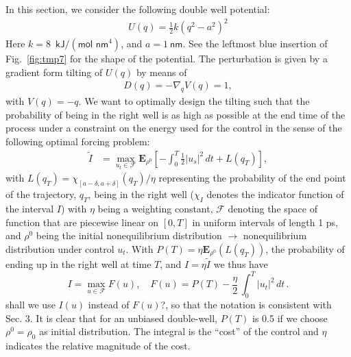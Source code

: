 \documentclass[]{tMPH2e}
\newcommand{\recheck}[1]{{\color{red} #1}}
\newcommand{\bE}{{\mathbf E}}
\begin{document}
In this section, we consider the following double well potential:
\begin{align}
  U( q) = \frac12 k ( q^2 - a^2)^2
\end{align}
Here $k = 8$~$\textsf{kJ} / (\textsf{mol nm}^4)$, and $ a = 1\
\textsf{nm}$.  See the leftmost blue insertion of Fig.~\ref{fig:tmp7} for
the shape of the potential.
The perturbation is given by a gradient form tilting of $U( q)$ by means of
\begin{align}
   D( q) = -\nabla_{ q} V( q) = 1,
\end{align}
with $V( q) = - q$. We want to
optimally design the tilting such that the probability
of being in the right well is as high as possible 
at the end time of the process under a constraint on the energy used for the control in the sense of
the following optimal forcing problem:
\begin{align}
  \tilde{I} & = \max_{u_t \in\mathcal F} \bE_{\rho^0}\left[ -\int_{0}^{T} \frac{1}{2}|u_{s}|^{2}\,dt + L(q_T) \right],
\end{align}
with $L(q_T)=\chi_{[a-\delta,a+\delta]}(q_T)/\eta$ representing the probability of the end point of the trajectory, $ q_T$, being in the right well ($\chi_I$ denotes the indicator function of the interval $I$) with $\eta$ being a weighting constant, ${\mathcal F}$ denoting the space of function that are piecewise linear  on $[0, T]$ in uniform intervals of length 1 ps, and $\rho^0$ being the
\recheck{initial nonequilibrium distribution $\rightarrow$ nonequilibrium distribution under control $u_t$}. With $P(T) = \eta \bE_{\rho^0}(L(q_T))$, the probability of ending up in the right well at time $T$, and $I=\eta \tilde{I}$ we thus have
\[
  I = \max_{u \in\mathcal F} F(u),\quad F(u)= P(T) -
  \frac{\eta}{2}\,
   \int_0^T |u_t|^2\, dt\,.
   \]
   \recheck{shall we use $I(u)$ instead of $F(u)$?, so that the
     notation is consistent with  Sec. 3.}
 It is
clear that for an unbiased double-well, $P(T)$
is 0.5 if we choose $\rho^0=\rho_0$ as initial distribution.  The integral is the ``cost'' of the control and $\eta$  indicates the relative magnitude of the
cost. 
\end{document}
